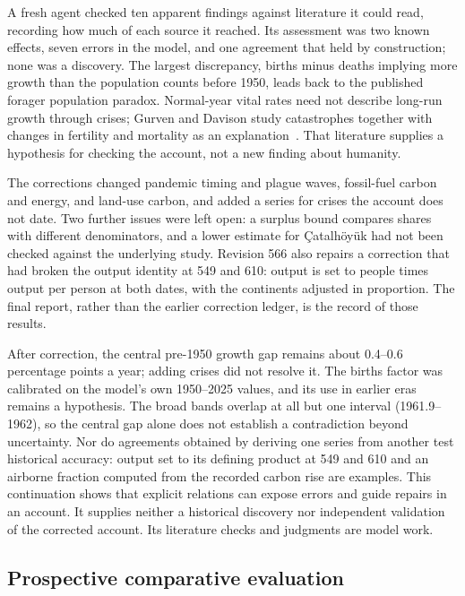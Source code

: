 \documentclass[11pt,a4paper]{article}
\begin{document}
A fresh agent checked ten apparent findings against literature it could read,
recording how much of each source it reached. Its assessment was two known
effects, seven errors in the model, and one agreement that held by construction;
none was a discovery. The largest discrepancy, births minus deaths implying
more growth than the population counts before 1950, leads back to the published
forager population paradox. Normal-year vital rates need not describe long-run
growth through crises; Gurven and Davison study catastrophes together with
changes in fertility and mortality as an explanation~\cite{gurvenDavison2019}.
That literature supplies a hypothesis for checking the account, not a new
finding about humanity.

The corrections changed pandemic timing and plague waves, fossil-fuel carbon
and energy, and land-use carbon, and added a series for crises the account does
not date. Two further issues were left open: a surplus bound compares shares with
different denominators, and a lower estimate for \c{C}atalh\"oy\"uk had not been
checked against the underlying study. Revision 566 also repairs a correction
that had broken the output identity at 549 and 610: output is set to people
times output per person at both dates, with the continents adjusted in
proportion. The final report, rather than the earlier correction ledger, is the
record of those results.

After correction, the central pre-1950 growth gap remains about 0.4--0.6
percentage points a year; adding crises did not resolve it. The births factor
was calibrated on the model's own 1950--2025 values, and its use in earlier eras
remains a hypothesis. The broad bands overlap at all but one interval
(1961.9--1962), so the central gap alone does not establish a contradiction
beyond uncertainty.
Nor do agreements obtained by deriving one series from another test historical
accuracy: output set to its defining product at 549 and 610 and an airborne fraction computed
from the recorded carbon rise are examples. This continuation shows that
explicit relations can expose errors and guide repairs in an account. It
supplies neither a historical discovery nor independent validation of the
corrected account. Its literature checks and judgments are model work.

\subsection{Prospective comparative evaluation}
\label{sec:prospective-evaluation}
\end{document}
